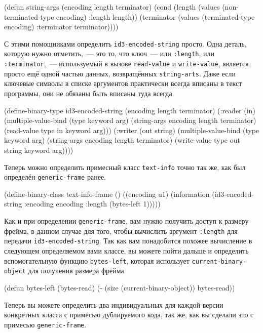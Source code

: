 \begin{myverb}
(defun string-args (encoding length terminator)
  (cond 
    (length
     (values (non-terminated-type encoding) :length length))
    (terminator
     (values (terminated-type encoding) :terminator terminator))))
\end{myverb}

С этими помощниками определить \lstinline{id3-encoded-string} просто. Одна деталь, которую
нужно отметить,~--- это то, что ключ~--- или \lstinline{:length}, или \lstinline{:terminator},~---
используемый в вызове \lstinline{read-value} и \lstinline{write-value}, является просто ещё одной
частью данных, возвращённых \lstinline{string-arts}. Даже если ключевые символы в списке
аргументов практически всегда вписаны в текст программы, они не обязаны быть вписаны туда
всегда.

\begin{myverb}
(define-binary-type id3-encoded-string (encoding length terminator)
  (:reader (in) 
    (multiple-value-bind (type keyword arg)
        (string-args encoding length terminator)
      (read-value type in keyword arg)))
  (:writer (out string)
    (multiple-value-bind (type keyword arg)
        (string-args encoding length terminator)
      (write-value type out string keyword arg))))
\end{myverb}

Теперь можно определить примесный класс \lstinline{text-info} точно так же, как был определён
\lstinline{generic-frame} ранее.

\begin{myverb}
(define-binary-class text-info-frame ()
  ((encoding u1)
   (information (id3-encoded-string :encoding encoding :length (bytes-left 1)))))
\end{myverb}

Как и при определении \lstinline{generic-frame}, вам нужно получить доступ к размеру фрейма, в
данном случае для того, чтобы вычислить аргумент \lstinline{:length} для передачи
\lstinline{id3-encoded-string}. Так как вам понадобится похожее вычисление в следующем определяемом
вами классе, вы можете пойти дальше и определить вспомогательную функцию \lstinline{bytes-left},
которая использует \lstinline{current-binary-object} для получения размера фрейма.

\begin{myverb}
(defun bytes-left (bytes-read)
  (- (size (current-binary-object)) bytes-read))
\end{myverb}

Теперь вы можете определить два индивидуальных для каждой версии конкретных класса с
примесью дублируемого кода, так же, как вы сделали это с примесью \lstinline{generic-frame}.

